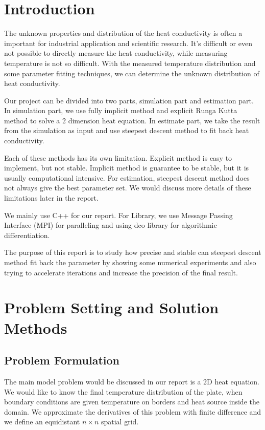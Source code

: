 \documentclass[10pt,a4paper]{report}
\begin{document}
\tableofcontents
\thispagestyle{empty}


\chapter{Introduction}
\setcounter{page}{1}
The unknown properties and distribution of the heat conductivity is often a important for industrial application and scientific research. It's difficult or even not possible to directly measure the heat conductivity, while measuring temperature is not so difficult. With the measured temperature distribution and some parameter fitting techniques, we can determine the unknown distribution of heat conductivity.

Our project can be divided into two parts, simulation part and estimation part. In simulation part, we use fully implicit method and explicit Runga Kutta method to solve a 2 dimension heat equation. In estimate part, we take the result from the simulation as input and use steepest descent method to fit back heat conductivity.
 
Each of these methods has its own limitation. Explicit method is easy to implement, but not stable. Implicit method is guarantee to be stable, but it is usually computational intensive. For estimation, steepest descent method does not always give the best parameter set. We would discuss more details of these limitations later in the report. 
 
We mainly use C++ for our report. For Library, we use Message Passing Interface (MPI) for paralleling  and using dco library for algorithmic differentiation.

The purpose of this report is to study how precise and stable can steepest descent method fit back the parameter by showing some numerical experiments and also trying to accelerate iterations and increase the precision of the final result.  

\chapter{Problem Setting and Solution Methods}
\section{Problem Formulation}

The main model problem would be discussed in our report is a 2D heat equation. We would like to know the final temperature distribution of the plate, when boundary conditions are given temperature on borders and heat source inside the domain. We approximate the derivatives of this problem with finite difference and we define an equidistant $n \times  n$ spatial grid. 
\end{document}
